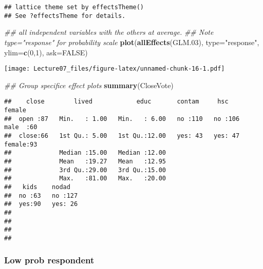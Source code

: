 \documentclass[
]{article}
\newenvironment{Shaded}{\begin{snugshade}}{\end{snugshade}}
\newcommand{\CommentTok}[1]{\textcolor[rgb]{0.56,0.35,0.01}{\textit{#1}}}
\newcommand{\DataTypeTok}[1]{\textcolor[rgb]{0.13,0.29,0.53}{#1}}
\newcommand{\DecValTok}[1]{\textcolor[rgb]{0.00,0.00,0.81}{#1}}
\newcommand{\FloatTok}[1]{\textcolor[rgb]{0.00,0.00,0.81}{#1}}
\newcommand{\KeywordTok}[1]{\textcolor[rgb]{0.13,0.29,0.53}{\textbf{#1}}}
\newcommand{\NormalTok}[1]{#1}
\newcommand{\OtherTok}[1]{\textcolor[rgb]{0.56,0.35,0.01}{#1}}
\newcommand{\StringTok}[1]{\textcolor[rgb]{0.31,0.60,0.02}{#1}}
\begin{document}
\begin{verbatim}
## lattice theme set by effectsTheme()
## See ?effectsTheme for details.
\end{verbatim}

\begin{Shaded}
\begin{Highlighting}[]
\CommentTok{## all independent variables with the others at average. }
\CommentTok{## Note type="response" for probability scale}
\KeywordTok{plot}\NormalTok{(}\KeywordTok{allEffects}\NormalTok{(GLM}\FloatTok{.03}\NormalTok{), }\DataTypeTok{type=}\StringTok{"response"}\NormalTok{, }\DataTypeTok{ylim=}\KeywordTok{c}\NormalTok{(}\DecValTok{0}\NormalTok{,}\DecValTok{1}\NormalTok{), }\DataTypeTok{ask=}\OtherTok{FALSE}\NormalTok{)}
\end{Highlighting}
\end{Shaded}

\texttt{[image: Lecture07\_files/figure-latex/unnamed-chunk-16-1.pdf]}

\begin{Shaded}
\begin{Highlighting}[]
\CommentTok{## Group specifice effect plots}
\KeywordTok{summary}\NormalTok{(CloseVote)}
\end{Highlighting}
\end{Shaded}

\begin{verbatim}
##    close        lived            educ       contam     hsc         female  
##  open :87   Min.   : 1.00   Min.   : 6.00   no :110   no :106   male  :60  
##  close:66   1st Qu.: 5.00   1st Qu.:12.00   yes: 43   yes: 47   female:93  
##             Median :15.00   Median :12.00                                  
##             Mean   :19.27   Mean   :12.95                                  
##             3rd Qu.:29.00   3rd Qu.:15.00                                  
##             Max.   :81.00   Max.   :20.00                                  
##   kids    nodad    
##  no :63   no :127  
##  yes:90   yes: 26  
##                    
##                    
##                    
## 
\end{verbatim}

\hypertarget{low-prob-respondent}{%
\subsubsection{Low prob respondent}\label{low-prob-respondent}}
\end{document}

